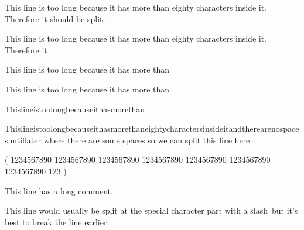 \documentclass{article}
\begin{document}
This line is too long because it has more than eighty characters inside it. Therefore it should be split.

This line is too long because it has more than eighty characters inside it. Therefore it %

This line is too long because it has more than %

This line is too long because it has more than%

Thislineistoolongbecauseithasmorethan%

Thislineistoolongbecauseithasmorethaneightycharactersinsideitandtherearenospacesuntillater where there are some spaces so we can split this line here

(
1234567890 1234567890 1234567890 1234567890 1234567890 1234567890 1234567890 123
)

This line has a long comment. %


This line would usually be split at the special character part with a slash\ but it's best to break the line earlier.
\end{document}
